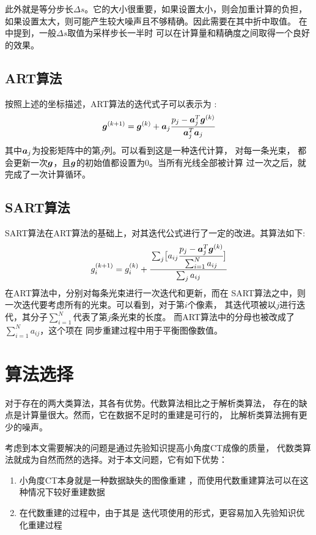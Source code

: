 此外就是等分步长$\Delta s$。它的大小很重要，如果设置太小，则会加重计算的负担，
如果设置太大，则可能产生较大噪声且不够精确。因此需要在其中折中取值。
在\cite{andersen1984simultaneous}中提到，一般$\Delta s$取值为采样步长一半时
可以在计算量和精确度之间取得一个良好的效果。

\subsection{ART算法}
按照上述的坐标描述，ART算法的迭代式子可以表示为\cite{gordon1974tutorial}
\cite{gordon1970algebraic}\cite{herman1973art}:
\begin{equation}
\bm{g}^{(k+1)}=\bm{g}^{(k)}+\bm{a}_j\cfrac{p_j-\bm{a}^T_j\bm{g}^{(k)}}{\bm{a}^T_j\bm{a}_j}
\end{equation}
其中$\bm{a}_j$为投影矩阵中的第$j$列。可以看到这是一种迭代计算，
对每一条光束，
都会更新一次$\bm{g}$，且$\bm{g}$的初始值都设置为$0$。当所有光线全部被计算
过一次之后，就完成了一次计算循环。
\subsection{SART算法}
SART算法在ART算法的基础上，对其迭代公式进行了一定的改进。其算法如下\cite{andersen1984simultaneous}:
\begin{equation}
g_i^{(k+1)}=g_i^{(k)}+\cfrac{\sum_j\bigl[a_{ij}\cfrac{p_j-\bm{a}^T_j\bm{g}^{(k)}}{\sum^N_{i=1}a_{ij}}\bigr]}{\sum_ja_{ij}}
\end{equation}
在ART算法中，分别对每条光束进行一次迭代和更新，而在
SART算法之中，则一次迭代要考虑所有的光束。可以看到，对于第$i$个像素，
其迭代项被以$j$进行迭代，其分子$\sum^N_{i=1}$代表了第$j$条光束的长度。
而ART算法中的分母也被改成了$\sum^N_{i=1}a_{ij}$，这个项在
同步重建过程中用于平衡图像数值。
\section{算法选择}
对于存在的两大类算法，其各有优势。代数算法相比之于解析类算法，
存在的缺点是计算量很大。然而，它在数据不足时的重建是可行的，
比解析类算法拥有更少的噪声。

考虑到本文需要解决的问题是通过先验知识提高小角度CT成像的质量，
代数类算法就成为自然而然的选择。对于本文问题，它有如下优势：
\begin{enumerate}
\item 小角度CT本身就是一种数据缺失的图像重建
，而使用代数重建算法可以在这种情况下较好重建数据
\item 在代数重建的过程中，由于其是
迭代项使用的形式，更容易加入先验知识优化重建过程
\end{enumerate}

